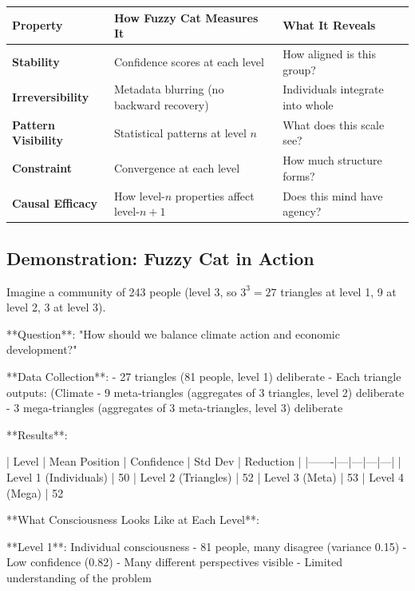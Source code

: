 \documentclass[12pt,a4paper]{article}
\theoremstyle{definition}
\begin{document}
{\begin{table}[H]
\centering
\begin{tabular}{|l|l|l|}
\hline
\textbf{Property} & \textbf{How Fuzzy Cat Measures It} & \textbf{What It Reveals} \\
\hline
\textbf{Stability} & Confidence scores at each level & How aligned is this group? \\
\hline
\textbf{Irreversibility} & Metadata blurring (no backward recovery) & Individuals integrate into whole \\
\hline
\textbf{Pattern Visibility} & Statistical patterns at level $n$ & What does this scale see? \\
\hline
\textbf{Constraint} & Convergence at each level & How much structure forms? \\
\hline
\textbf{Causal Efficacy} & How level-$n$ properties affect level-$n+1$ & Does this mind have agency? \\
\hline
\end{tabular}
\end{table}

\subsection{Demonstration: Fuzzy Cat in Action}

Imagine a community of 243 people (level 3, so $3^3 = 27$ triangles at level 1, 9 at level 2, 3 at level 3).

**Question**: "How should we balance climate action and economic development?"

**Data Collection**:
- 27 triangles (81 people, level 1) deliberate
- Each triangle outputs: (Climate%
- 9 meta-triangles (aggregates of 3 triangles, level 2) deliberate
- 3 mega-triangles (aggregates of 3 meta-triangles, level 3) deliberate

**Results**:

| Level | Mean Position | Confidence | Std Dev | Reduction |
|-------|---|---|---|---|
| Level 1 (Individuals) | 50%
| Level 2 (Triangles) | 52%
| Level 3 (Meta) | 53%
| Level 4 (Mega) | 52%

**What Consciousness Looks Like at Each Level**:

**Level 1**: Individual consciousness
- 81 people, many disagree (variance 0.15)
- Low confidence (0.82)
- Many different perspectives visible
- Limited understanding of the problem

}
\end{document}
